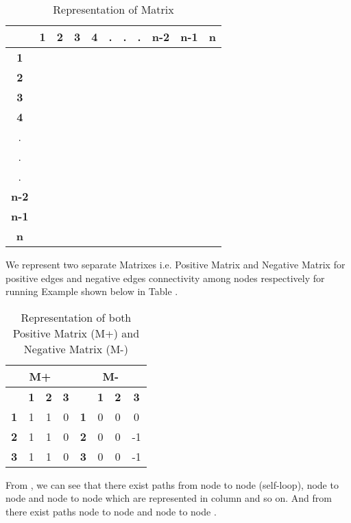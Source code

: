 \documentclass{article}
\begin{document}
\begin{table}[th]
\centering
\caption{Representation of  Matrix}
{\begin{tabular}{|c|c|c|c|c|c|c|c|c|c|c|}
\hline
\textbf{} & \textbf{1} & \textbf{2} & \textbf{3} & \textbf{4} & . & . & .& \textbf{n-2} & \textbf{n-1} &\textbf{n}\\
\hline 
\textbf{1} &  &   &  & & & & &  & &  \\
\hline 
\textbf{2} &  &   &  &  & & & &  & & \\
\hline 
\textbf{3} &  &   &  & & & & &  & &  \\
\hline 
\textbf{4} &  &   &  & & & & &  & &  \\
\hline 
.&  &   &  & & & & &  & &  \\
\hline
.&  &   &  & & & & &  & &  \\
\hline
.&  &   &  & & & & &  & &  \\
\hline
\textbf{n-2} &  &   &  &  & & & &  & &  \\
\hline
\textbf{n-1} &  &   &  &  & & & &  & &  \\
\hline
\textbf{n} &  &   &  &  & & & &  & &  \\
\hline
\end{tabular} }
\end{table} 
We represent two separate Matrixes i.e. Positive Matrix  and Negative Matrix  for positive edges and negative edges connectivity among nodes respectively for running Example  shown below in Table .
\begin{table}[th]
\centering
 \caption{Representation of  both Positive Matrix (M+) and Negative Matrix (M-)}
 {
  \begin{tabular}{|c|c|c|c|c|c|c|c|}
  \hline
  \multicolumn{4}{|c}{M+} & \multicolumn{4}{|c|}{M-} \\
  \hline
    & \textbf{1} & \textbf{2} & \textbf{3} &  & \textbf{1} & \textbf{2} & \textbf{3} \\ \hline
   \textbf{1} & 1 & 1 & 0 & \textbf{1} & 0 & 0 & 0\\ \hline
   \textbf{2} & 1 & 1 & 0 & \textbf{2} & 0 & 0 & -1\\ \hline
   \textbf{3} & 1 & 1 & 0 & \textbf{3} & 0 & 0 & -1\\ \hline
  \end{tabular} }
  \end{table} 
 From , we can see that there exist  paths from node  to node  (self-loop), node  to node  and node  to node  which are represented in column  and so on. And from  there exist paths node  to node  and node  to node .
\end{document}
